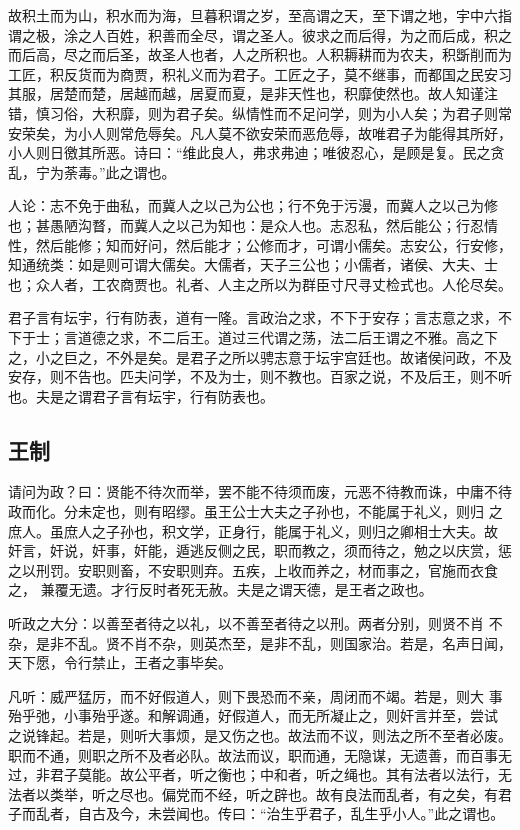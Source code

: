 \documentclass[]{article}
\begin{document}
故积土而为山，积水而为海，旦暮积谓之岁，至高谓之天，至下谓之地，宇中六指谓之极，涂之人百姓，积善而全尽，谓之圣人。彼求之而后得，为之而后成，积之而后高，尽之而后圣，故圣人也者，人之所积也。人积耨耕而为农夫，积斲削而为工匠，积反货而为商贾，积礼义而为君子。工匠之子，莫不继事，而都国之民安习其服，居楚而楚，居越而越，居夏而夏，是非天性也，积靡使然也。故人知谨注错，慎习俗，大积靡，则为君子矣。纵情性而不足问学，则为小人矣；为君子则常安荣矣，为小人则常危辱矣。凡人莫不欲安荣而恶危辱，故唯君子为能得其所好，小人则日徼其所恶。诗曰：``维此良人，弗求弗迪；唯彼忍心，是顾是复。民之贪乱，宁为荼毒。''此之谓也。

人论：志不免于曲私，而冀人之以己为公也；行不免于污漫，而冀人之以己为修也；甚愚陋沟瞀，而冀人之以己为知也：是众人也。志忍私，然后能公；行忍情性，然后能修；知而好问，然后能才；公修而才，可谓小儒矣。志安公，行安修，知通统类：如是则可谓大儒矣。大儒者，天子三公也；小儒者，诸侯、大夫、士也；众人者，工农商贾也。礼者、人主之所以为群臣寸尺寻丈检式也。人伦尽矣。

君子言有坛宇，行有防表，道有一隆。言政治之求，不下于安存；言志意之求，不下于士；言道德之求，不二后王。道过三代谓之荡，法二后王谓之不雅。高之下之，小之巨之，不外是矣。是君子之所以骋志意于坛宇宫廷也。故诸侯问政，不及安存，则不告也。匹夫问学，不及为士，则不教也。百家之说，不及后王，则不听也。夫是之谓君子言有坛宇，行有防表也。

\hypertarget{header-n44}{%
\subsection{王制}\label{header-n44}}

请问为政？曰：贤能不待次而举，罢不能不待须而废，元恶不待教而诛，中庸不待政而化。分未定也，则有昭缪。虽王公士大夫之子孙也，不能属于礼义，则归
之庶人。虽庶人之子孙也，积文学，正身行，能属于礼义，则归之卿相士大夫。故
奸言，奸说，奸事，奸能，遁逃反侧之民，职而教之，须而待之，勉之以庆赏，惩
之以刑罚。安职则畜，不安职则弃。五疾，上收而养之，材而事之，官施而衣食之，
兼覆无遗。才行反时者死无赦。夫是之谓天德，是王者之政也。

听政之大分：以善至者待之以礼，以不善至者待之以刑。两者分别，则贤不肖
不杂，是非不乱。贤不肖不杂，则英杰至，是非不乱，则国家治。若是，名声日闻，
天下愿，令行禁止，王者之事毕矣。

凡听：威严猛厉，而不好假道人，则下畏恐而不亲，周闭而不竭。若是，则大
事殆乎弛，小事殆乎遂。和解调通，好假道人，而无所凝止之，则奸言并至，尝试
之说锋起。若是，则听大事烦，是又伤之也。故法而不议，则法之所不至者必废。
职而不通，则职之所不及者必队。故法而议，职而通，无隐谋，无遗善，而百事无
过，非君子莫能。故公平者，听之衡也；中和者，听之绳也。其有法者以法行，无
法者以类举，听之尽也。偏党而不经，听之辟也。故有良法而乱者，有之矣，有君
子而乱者，自古及今，未尝闻也。传曰：``治生乎君子，乱生乎小人。''此之谓也。
\end{document}
